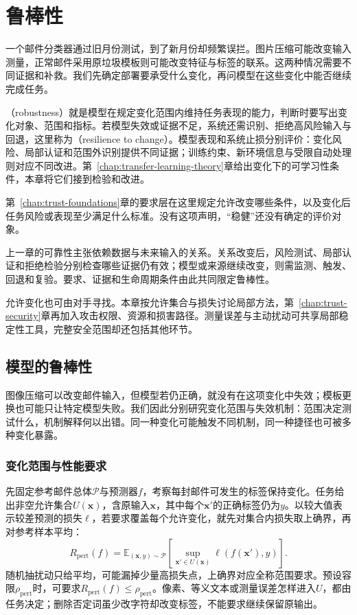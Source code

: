 \chapter{鲁棒性}
\label{chap:trust-robustness}

一个邮件分类器通过旧月份测试，到了新月份却频繁误拦。图片压缩可能改变输入测量，正常邮件采用原垃圾模板则可能改变特征与标签的联系。这两种情况需要不同证据和补救。我们先确定部署要承受什么变化，再问模型在这些变化中能否继续完成任务。

（robustness）就是模型在规定变化范围内维持任务表现的能力，判断时要写出变化对象、范围和指标。若模型失效或证据不足，系统还需识别、拒绝高风险输入与回退，这里称为（resilience to change）。模型表现和系统止损分别评价：变化风险、局部认证和范围外识别提供不同证据；训练约束、新环境信息与受限自动处理则对应不同改进。第~\ref{chap:transfer-learning-theory}章给出变化下的可学习性条件，本章将它们接到检验和改进。

第~\ref{chap:trust-foundations}章的要求层在这里规定允许改变哪些条件，以及变化后任务风险或表现至少满足什么标准。没有这项声明，“稳健”还没有确定的评价对象。

上一章的可靠性主张依赖数据与未来输入的关系。关系改变后，风险测试、局部认证和拒绝检验分别检查哪些证据仍有效；模型或来源继续改变，则需监测、触发、回退和复验。要求、证据和生命周期条件由此共同限定鲁棒性。

允许变化也可由对手寻找。本章按允许集合与损失讨论局部方法，第~\ref{chap:trust-security}章再加入攻击权限、资源和损害路径。测量误差与主动扰动可共享局部稳定性工具，完整安全范围却还包括其他环节。

\section{模型的鲁棒性}
\label{sec:robustness-fragility}

图像压缩可以改变邮件输入，但模型若仍正确，就没有在这项变化中失效；模板更换也可能只让特定模型失败。我们因此分别研究变化范围与失效机制：范围决定测试什么，机制解释何以出错。同一种变化可能触发不同机制，同一种捷径也可被多种变化暴露。

\subsection{变化范围与性能要求}
\label{sec:robustness-change-scope}

先固定参考邮件总体$\mathcal P$与预测器$f$，考察每封邮件可发生的标签保持变化。任务给出非空允许集合$U(\bm{x})$，含原输入$\bm{x}$，其中每个$\bm{x}'$的正确标签仍为$y$。以较大值表示较差预测的损失$\ell$，若要求覆盖每个允许变化，就先对集合内损失取上确界，再对参考样本平均：
\begin{equation}
 R_{\mathrm{pert}}(f)
 =\mathbb E_{(\bm{x},y)\sim\mathcal P}
   \left[\sup_{\bm{x}'\in U(\bm{x})}
   \ell(f(\bm{x}'),y)\right].
 \label{eq:robustness-perturbation-risk}
\end{equation}
随机抽扰动只给平均，可能漏掉少量高损失点，上确界对应全称范围要求。预设容限$\rho_{\mathrm{pert}}$时，可要求$R_{\mathrm{pert}}(f)\leq\rho_{\mathrm{pert}}$。像素、等义文本或测量误差怎样进入$U$，都由任务决定；删除否定词虽少改字符却改变标签，不能要求继续保留原输出。

